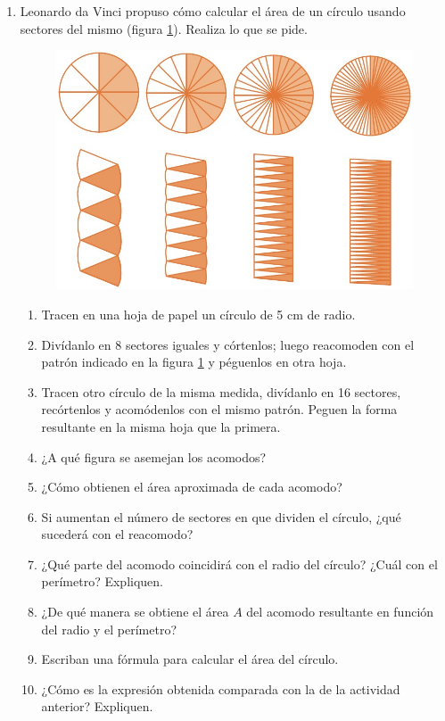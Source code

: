 \documentclass[11pt]{book}
\begin{document}
\begin{enumerate}
  \item Leonardo da Vinci propuso cómo calcular el área de un círculo usando sectores del mismo (figura \ref{fig:17.4}). Realiza lo que se pide.

        \begin{figure}[H]
          \centering
          \includegraphics[width=.8\linewidth]{17.4.jpg}
          \label{fig:17.4}
        \end{figure}
        \begin{enumerate}
          \item Tracen en una hoja de papel un círculo de 5 cm de radio.
          \item Divídanlo en 8 sectores iguales y córtenlos; luego reacomoden con el patrón indicado en la figura \ref{fig:17.4} y péguenlos en otra hoja.
          \item Tracen otro círculo de la misma medida, divídanlo en 16 sectores, recórtenlos y acomódenlos con el mismo patrón. Peguen la forma resultante en la misma hoja que la primera.
          \item ¿A qué figura se asemejan los acomodos?
          \item ¿Cómo obtienen el área aproximada de cada acomodo?
          \item Si aumentan el número de sectores en que dividen el círculo, ¿qué sucederá con el reacomodo?
          \item ¿Qué parte del acomodo coincidirá con el radio del círculo? ¿Cuál con el perímetro? Expliquen.
          \item ¿De qué manera se obtiene el área $A$ del acomodo resultante en función del radio y el perímetro?
          \item Escriban una fórmula para calcular el área del círculo.
          \item ¿Cómo es la expresión obtenida comparada con la de la actividad anterior? Expliquen.
        \end{enumerate}


\end{enumerate}
\end{document}
